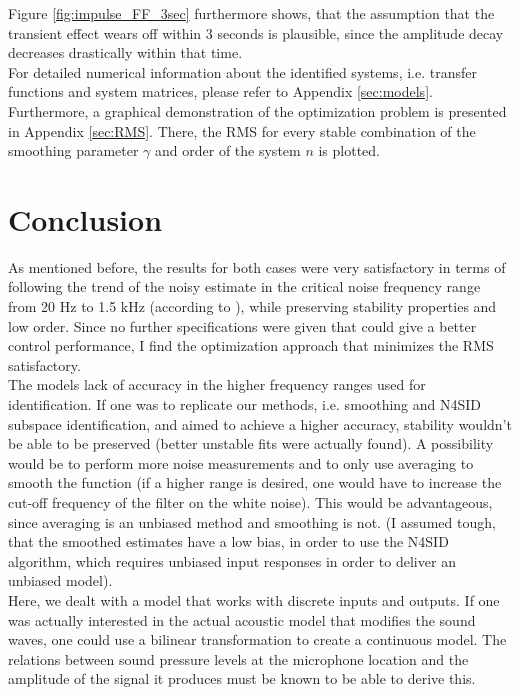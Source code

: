 Figure \ref{fig:impulse_FF_3sec} furthermore shows, that the assumption that the transient effect wears off within 3 seconds is plausible, since the amplitude decay decreases drastically within that time.\\

For detailed numerical information about the identified systems, i.e. transfer functions and system matrices, please refer to Appendix \ref{sec:models}.\\

Furthermore, a graphical demonstration of the optimization problem is presented in Appendix \ref{sec:RMS}. There, the RMS for every stable combination of the smoothing parameter $\gamma$ and order of the system $n$ is plotted.

\chapter{Conclusion}\label{chap:conclusion}

As mentioned before, the results for both cases were very satisfactory in terms of following the trend of the noisy estimate in the critical noise frequency range from 20 Hz to 1.5 kHz (according to \cite{castae2010active}), while preserving stability properties and low order. Since no further specifications were given that could give a better control performance, I find the optimization approach that minimizes the RMS satisfactory.\\

The models lack of accuracy in the higher frequency ranges used for identification. If one was to replicate our methods, i.e. smoothing and N4SID subspace identification, and aimed to achieve a higher accuracy, stability wouldn't be able to be preserved (better unstable fits were actually found). A possibility would be to perform more noise measurements and to only use averaging to smooth the function (if a higher range is desired, one would have to increase the cut-off frequency of the filter on the white noise). This would be advantageous, since averaging is an unbiased method and smoothing is not. (I assumed tough, that the smoothed estimates have a low bias, in order to use the N4SID algorithm, which requires unbiased input responses in order to deliver an unbiased model).\\

Here, we dealt with a model that works with discrete inputs and outputs. If one was actually interested in the actual acoustic model that modifies the sound waves, one could use a bilinear transformation to create a continuous model. The relations between sound pressure levels at the microphone location and the amplitude of the signal it produces must be known to be able to derive this.\\


